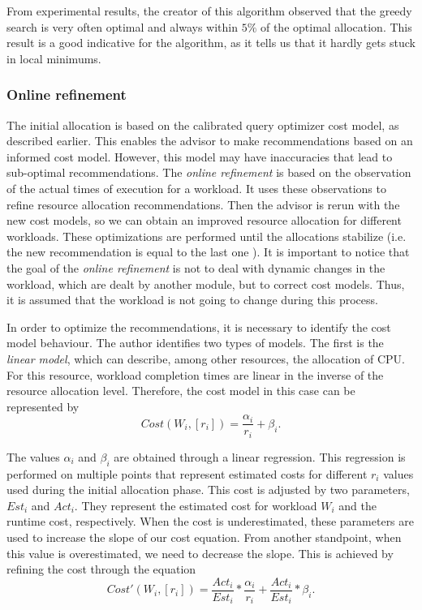 From experimental results, the creator of this algorithm observed that the greedy search is very often optimal and always within $5\%$ of the optimal allocation. This result is a good indicative for the algorithm, as it tells us that it hardly gets stuck in local minimums.



\subsubsection{Online refinement}
\label{subsec:ref}

The initial allocation is based on the calibrated query optimizer cost model, as described earlier. This enables the advisor to make recommendations based on an informed cost model. However, this model may have inaccuracies that lead to sub-optimal recommendations. The  \textit{online refinement} is based on the observation of the actual times of execution for a workload. It uses these observations to refine resource allocation recommendations. Then the advisor is rerun with the new cost models, so  we can obtain an improved resource allocation for different workloads. These optimizations are performed until the allocations stabilize (i.e. the new recommendation is equal to the last one ). It is important to notice that the goal of the \textit{online refinement} is not to deal with dynamic changes in the workload, which are dealt by another module, but to correct cost models. Thus, it is assumed that the workload is not going to change during this process. 

In order to optimize the recommendations, it is necessary to identify the cost model behaviour. The author identifies two types of models. The first is the \textit{linear model}, which can describe, among other resources, the allocation of CPU. For this resource, workload completion times are linear in the inverse of the resource allocation level. Therefore, the cost model in this case can be represented by
\[
 Cost(W_{i}, [r_{i}]) = \frac{\alpha_{i}}{r_{i}} +\beta_{i}.
\]

The values $\alpha_{i}$ and $\beta_{i}$ are obtained through a linear regression. This regression is performed on multiple points that represent estimated costs for different $r_{i}$ values used during the initial allocation phase. This cost is adjusted by two parameters, $Est_{i}$ and $Act_{i}$. They represent the estimated cost for workload $W_{i}$ and the runtime cost, respectively. When the cost is underestimated, these parameters are used to increase the slope of our cost equation. From another standpoint, when this value is overestimated, we need to decrease the slope. This is achieved by refining the cost through the equation
\[
  Cost'(W_{i}, [r_{i}]) = \frac{Act_{i}}{Est_{i}} * \frac{\alpha_{i}}{r_{i}} + \frac{Act_{i}}{Est_{i}} * \beta_{i}.
\]

